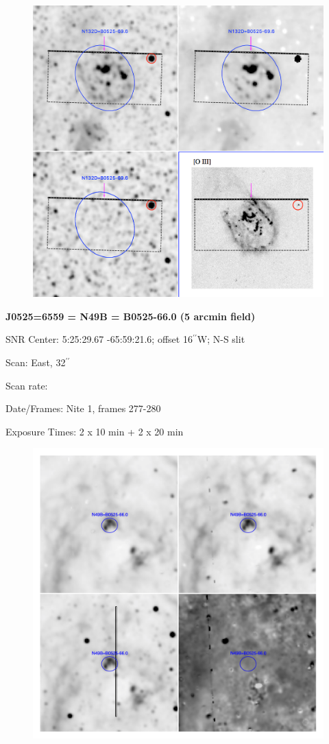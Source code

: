 \documentclass[11pt]{article}
\newcommand{\arcsec}{$^{\prime\prime}$}
\begin{document}
\begin{figure}
\includegraphics[width=12.5cm]{snapshots/N132D_5arcmin.png}
\end{figure}


\newpage
{\bf J0525=6559 = N49B = B0525-66.0 (5 arcmin field)}  
 
SNR Center:   5:25:29.67  -65:59:21.6;     offset 16\arcsec W;  N-S slit

Scan:  East, 32\arcsec

Scan rate:  

Date/Frames:  Nite 1, frames 277-280

Exposure Times:  2 x 10 min  +  2 x 20 min

\begin{figure}
\includegraphics[width=11.cm]{snapshots/N49B_5arcmin.png}
\end{figure}
\end{document}
